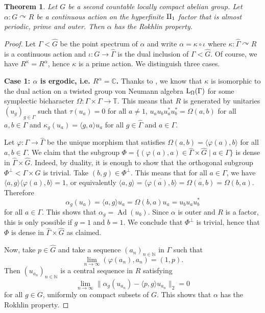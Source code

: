 \documentclass[a4paper,11pt]{amsart}
\numberwithin{equation}{section}
\newtheorem{theorem}{Theorem}[section]
\theoremstyle{definition}
\newcommand{\C}{\mathbb{C}}
\newcommand{\N}{\mathbb{N}}
\newcommand{\T}{\mathbb{T}}
\newcommand{\Ad}{\operatorname{Ad}}
\newcommand{\rL}{\mathord{\text{\rm L}}}
\newcommand{\II}{{\rm II}}
\begin{document}
\begin{theorem}
     Let $G$ be a second countable locally compact abelian group. Let $\alpha : G \curvearrowright R$ be a continuous action on the hyperfinite $\II_1$ factor that is almost periodic, prime and outer. Then $\alpha$ has the Rokhlin property.
\end{theorem}
\begin{proof}
    Let $\Gamma < \widehat{G}$ be the point spectrum of $\alpha$ and write $\alpha=\kappa \circ \iota$ where $\kappa : \widehat{\Gamma} \curvearrowright R$ is a continuous action and $\iota : G \rightarrow \widehat{\Gamma}$ is the dual inclusion of $\Gamma < \widehat{G}$. Of course, we have $R^\kappa=R^\alpha$, hence $\kappa$ is a prime action. We distinguish three cases.

    
    \textbf{Case 1: $\alpha$ is ergodic, i.e.\! $R^\alpha=\C$.} Thanks to \cite{OPT79}, we know that $\kappa$ is isomorphic to the dual action on a twisted group von Neumann algebra $\rL_\Omega(\Gamma)$ for some symplectic bicharacter $\Omega : \Gamma \times \Gamma \rightarrow \T$. This means that $R$ is generated by unitaries $(u_g)_{g \in \Gamma}$ such that $\tau(u_a)=0$ for all $a \neq 1$, $u_au_bu_a^*u_b^*=\Omega(a,b)$ for all $a,b \in \Gamma$ and $\kappa_g(u_a)=\langle g, a \rangle u_a$ for all $g \in \widehat \Gamma$ and $a \in \Gamma$.
    
    Let $\varphi : \Gamma \rightarrow \widehat{\Gamma}$ be the unique morphism that satisfies $\Omega(a,b)=\langle \varphi(a),b \rangle$ for all $a,b \in \Gamma$. We claim that the subgroup $\Phi = \{ (\varphi(a),a) \in \widehat{\Gamma} \times \widehat{G} \mid a \in \Gamma \}$ is dense in $\widehat{\Gamma} \times \widehat{G}$. Indeed, by duality, it is enough to show that the orthogonal subgroup $\Phi^\perp < \Gamma \times G$ is trivial. Take $(b,g) \in \Phi^\perp$. This means that for all $a \in \Gamma$, we have $\langle a,g \rangle \langle \varphi(a),b \rangle=1$, or equivalently  $\langle a,g \rangle =\overline{\langle \varphi(a),b \rangle} =\overline{\Omega(a,b)}=\Omega(b,a)$. Therefore $$\alpha_g(u_a)=\langle a,g \rangle u_a = \Omega(b,a) u_a = u_bu_au_b^*$$
    for all $a \in \Gamma$. This shows that $\alpha_g = \Ad(u_b)$. Since $\alpha$ is outer and $R$ is a factor, this is only possible if $g=1$ and $b=1$. We conclude that $\Phi^\perp$ is trivial, hence that $\Phi$ is dense in $\widehat{\Gamma} \times \widehat{G}$ as claimed.

    Now, take $p \in \widehat{G}$ and take a sequence $(a_n)_{n \in \N}$ in $\Gamma$ such that $$\lim_{n \to \infty} (\varphi(a_n),a_n)=(1,p).$$ Then $(u_{a_n})_{n \in \N}$ is a central sequence in $R$ satisfying $$\lim_{n \to \infty} \| \alpha_g(u_{a_n}) - \langle p,g\rangle u_{a_n}\|_2 = 0$$ for all $g \in G$, uniformly on compact subsets of $G$. This shows that $\alpha$ has the Rokhlin property.


\end{proof}
\end{document}
